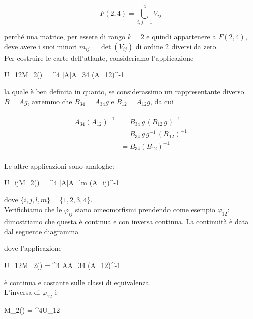 \begin{equation}
	F(2,4) = \bigcup_{i,j=1}^{4} V_{ij}
\end{equation}

perché una matrice, per essere di rango $ k=2 $ e quindi appartenere a $ F(2,4) $, deve avere i suoi minori $ m_{ij} = \det(V_{ij}) $ di ordine 2 diversi da zero. \\
Per costruire le carte dell'atlante, consideriamo l'applicazione

	{U_{12}}{M_{2}(\R) = \R^{4}}
	{[A]}{A_{34} (A_{12})^{-1}}

la quale è ben definita in quanto, se considerassimo un rappresentante diverso $ B = A g $, avremmo che $ B_{34} = A_{34} g $ e $ B_{12} = A_{12} g $, da cui

\begin{align}
	\begin{split}
		A_{34} (A_{12})^{-1} &= B_{34} \, g \, (B_{12} \, g)^{-1} \\
		&= B_{34} \, g \, g^{-1} \, (B_{12})^{-1} \\
		&= B_{34} (B_{12})^{-1}
	\end{split}
\end{align}

Le altre applicazioni sono analoghe:

	{U_{ij}}{M_{2}(\R) = \R^{4}}
	{[A]}{A_{lm} (A_{ij})^{-1}}

dove $ \{i,j,l,m\}=\{1,2,3,4\} $. \\
Verifichiamo che le $ \varphi_{ij} $ siano omeomorfismi prendendo come esempio $ \varphi_{12} $: dimostriamo che questa è continua e con inversa continua. La continuità è data dal seguente diagramma


dove l'applicazione

	{U_{12}}{M_{2}(\R) = \R^{4}}
	{A}{A_{34} (A_{12})^{-1}}

è continua e costante sulle classi di equivalenza. \\
L'inversa di $ \varphi_{12} $ è

	{M_{2}(\R) = \R^{4}}{U_{12}}
	{}{}

